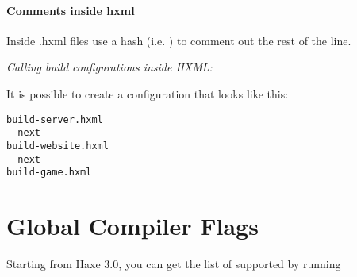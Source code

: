 \paragraph{Comments inside hxml}

Inside .hxml files use a hash (i.e. \ic{\#}) to comment out the rest of the line. 

\emph{Calling build configurations inside HXML:}

It is possible to create a configuration that looks like this:

\begin{lstlisting}
build-server.hxml  
--next  
build-website.hxml  
--next  
build-game.hxml
\end{lstlisting}


\section{Global Compiler Flags}
\label{compiler-usage-flags}

Starting from Haxe 3.0, you can get the list of supported  by running 


